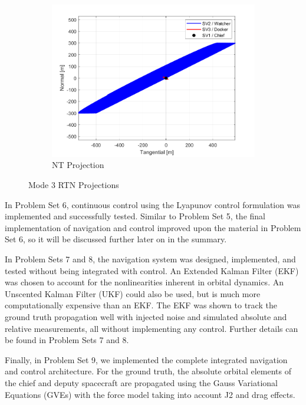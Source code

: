 \begin{figure}[H]
\begin{subfigure}[b]{0.32\linewidth}
        \includegraphics[width=\linewidth]{sim/figures/PS5/mode_3_RTN.png_NT.png}
        \caption{NT Projection}
        \label{fig:mode_3_nt}
    \end{subfigure}
    \caption{Mode 3 RTN Projections}
    \label{fig:mode_3_rtn}
\end{figure}

In Problem Set 6, continuous control using the Lyapunov control formulation was implemented and successfully tested. Similar to Problem Set 5, the final implementation of navigation and control improved upon the material in Problem Set 6, so it will be discussed further later on in the summary.

In Problem Sets 7 and 8, the navigation system was designed, implemented, and tested without being integrated with control. An Extended Kalman Filter (EKF) was chosen to account for the nonlinearities inherent in orbital dynamics. An Unscented Kalman Filter (UKF) could also be used, but is much more computationally expensive than an EKF. The EKF was shown to track the ground truth propagation well with injected noise and simulated absolute and relative measurements, all without implementing any control. Further details can be found in Problem Sets 7 and 8.

Finally, in Problem Set 9, we implemented the complete integrated navigation and control architecture. For the ground truth, the absolute orbital elements of the chief and deputy spacecraft are propagated using the Gauss Variational Equations (GVEs) with the force model taking into account J2 and drag effects. 

